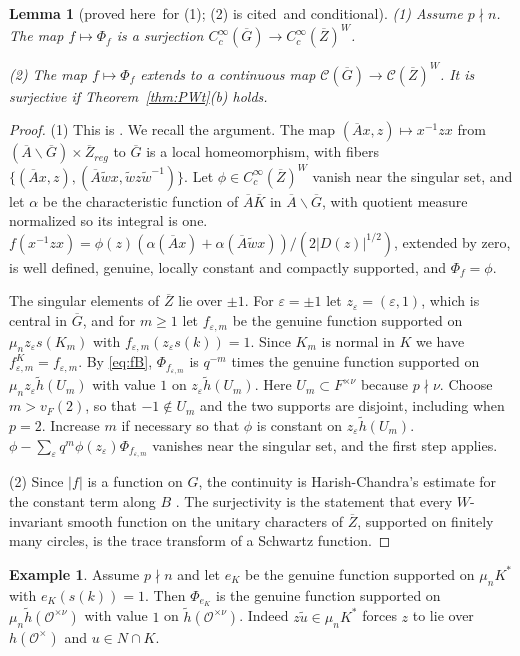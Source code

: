 \documentclass[12pt,letterpaper]{article}
\numberwithin{equation}{section}
\newtheorem{lemma}[theorem]{Lemma}
\theoremstyle{definition}
\newtheorem{xexample}[theorem]{Example}
\newcommand{\proved}{proved here}
\newcommand{\cited}{cited}
\newcommand{\cond}{conditional}
\newcommand{\OF}{\mathcal O}
\newcommand{\bG}{\overline{G}}
\newcommand{\bA}{\overline{A}}
\newcommand{\bZ}{\overline{Z}}
\newcommand{\bK}{\overline{K}}
\newcommand{\wt}{\tilde w}
\newcommand{\hl}{\tilde h}
\newcommand{\calC}{\mathcal C}
\begin{document}
\begin{lemma}[\proved\ for (1); (2) is \cited\ and \cond]\label{lem:orbital-image}
(1) Assume $p\nmid n$.  The map $f\mapsto\Phi_f$ is a surjection
$C_c^\infty(\bG)\to C_c^\infty(\bZ)^W$.

(2) The map $f\mapsto\Phi_f$ extends to a continuous map
$\calC(\bG)\to\calC(\bZ)^W$.  It is surjective if Theorem~\ref{thm:PWt}(b) holds.
\end{lemma}
\begin{proof}
(1) This is \cite[Theorem on the image of the split orbital integral]{JoUD}.  We recall
the argument.  The map $(\bA x,z)\mapsto x^{-1}zx$ from
$(\bA\backslash\bG)\times\bZ_{reg}$ to $\bG$ is a local homeomorphism, with fibers
$\{(\bA x,z),(\bA\wt x,\wt z\wt^{-1})\}$.  Let $\phi\in C_c^\infty(\bZ)^W$ vanish near the
singular set, and let $\alpha$ be the characteristic function of $\bA\bK$ in
$\bA\backslash\bG$, with quotient measure normalized so its integral is one.
$f(x^{-1}zx)=\phi(z)(\alpha(\bA x)+\alpha(\bA\wt x))/(2|D(z)|^{1/2})$, extended by zero, is
well defined, genuine, locally constant and compactly supported, and $\Phi_f=\phi$.

The singular elements of $\bZ$ lie over $\pm1$.  For $\varepsilon=\pm1$ let
$z_\varepsilon=(\varepsilon,1)$, which is central in $\bG$, and for $m\ge1$ let
$f_{\varepsilon,m}$ be the genuine function supported on $\mu_nz_\varepsilon s(K_m)$ with
$f_{\varepsilon,m}(z_\varepsilon s(k))=1$.  Since $K_m$ is normal in $K$ we have
$f_{\varepsilon,m}^K=f_{\varepsilon,m}$.  By \eqref{eq:fB},
$\Phi_{f_{\varepsilon,m}}$ is $q^{-m}$ times the genuine function supported on
$\mu_nz_\varepsilon\hl(U_m)$ with value $1$ on $z_\varepsilon\hl(U_m)$.  Here
$U_m\subset F^{\times\nu}$ because $p\nmid\nu$. Choose $m>v_F(2)$, so that
$-1\notin U_m$ and the two supports are disjoint, including when $p=2$.
Increase $m$ if necessary so that $\phi$ is constant on $z_\varepsilon\hl(U_m)$.
$\phi-\sum_\varepsilon q^m\phi(z_\varepsilon)\Phi_{f_{\varepsilon,m}}$ vanishes near the
singular set, and the first step applies.

(2) Since $|f|$ is a function on $G$, the continuity is Harish-Chandra's estimate for the
constant term along $B$ \cite[\S4.4]{Si79}.  The surjectivity is the statement that every
$W$-invariant smooth function on the unitary characters of $\bZ$, supported on finitely
many circles, is the trace transform of a Schwartz function.
\end{proof}

\begin{xexample}\label{ex:Phi-eK}
Assume $p\nmid n$ and let $e_K$ be the genuine function supported on $\mu_nK^*$ with
$e_K(s(k))=1$.  Then $\Phi_{e_K}$ is the genuine function supported on
$\mu_n\hl(\OF^{\times\nu})$ with value $1$ on $\hl(\OF^{\times\nu})$.  Indeed $z\tilde u\in\mu_nK^*$
forces $z$ to lie over $h(\OF^\times)$ and $u\in N\cap K$.
\end{xexample}
\end{document}
